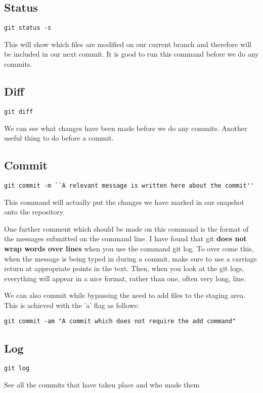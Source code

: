 \documentclass[a4paper, 10pt]{article}
\begin{document}
\subsection*{Status}
\begin{Verbatim}
git status -s
\end{Verbatim}
This will show which files are modified on our current branch and therefore will be included in our next commit. It is good to run this command before we do any commits.


\subsection*{Diff}
\begin{Verbatim}
git diff
\end{Verbatim}
We can see what changes have been made before we do any commits. Another useful thing to do before a commit.


\subsection*{Commit}
\begin{Verbatim}
git commit -m ``A relevant message is written here about the commit''
\end{Verbatim}
This command will actually put the changes we have marked in our snapshot onto the repository.

One further comment which should be made on this command is the format of the messages submitted on the command line. I have found that git {\bf does not wrap words over lines} when you use the command git log. To over come this, when the message is being typed in during a commit, make sure to use a carriage return at appropriate points in the text. Then, when you look at the git logs, everything will appear in a nice format, rather than one, often very long, line.

We can also commit while bypassing the need to add files to the
staging area. This is achieved with the 'a' flag as follows:
\begin{verbatim}
git commit -am "A commit which does not require the add command"
\end{verbatim}

\subsection*{Log}
\begin{Verbatim}
git log
\end{Verbatim}
See all the commits that have taken place and who made them
\end{document}
